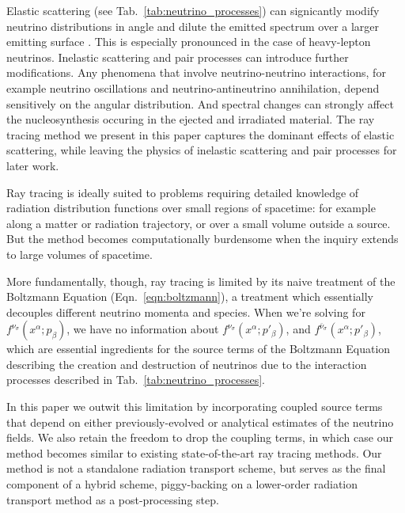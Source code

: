 \documentclass[aps,floatfix,prd,superscriptaddress,twocolumn]{revtex4-1}
\newcommand{\todo}[1]{\marginpar{\tiny{\textcolor{red}{#1}}}}
\begin{document}
Elastic scattering (see Tab.~\ref{tab:neutrino_processes}) can signicantly
modify neutrino distributions in angle and dilute the emitted spectrum over a
larger emitting surface \citep{pere2016-asl}.
This is especially pronounced in the case of heavy-lepton neutrinos.
\todo{cite}
Inelastic scattering and pair processes can introduce further modifications.
Any phenomena that involve neutrino-neutrino interactions,
for example neutrino oscillations and neutrino-antineutrino annihilation,
\todo{cite}
depend sensitively on the angular distribution.
And spectral changes can strongly affect the nucleosynthesis
occuring in the ejected and irradiated material.
\todo{justify these statements}
The ray tracing method we present in this paper captures the dominant effects
of elastic scattering, while leaving the physics of inelastic scattering and
pair processes for later work.

Ray tracing is ideally suited to problems requiring detailed knowledge of
radiation distribution functions over small regions of spacetime:
for example along a matter or radiation trajectory,
or over a small volume outside a source.
But the method becomes computationally burdensome when the inquiry extends
to large volumes of spacetime.

More fundamentally, though, ray tracing is limited by its naive
treatment of the Boltzmann Equation (Eqn.~\ref{eqn:boltzmann}),
a treatment which essentially decouples different neutrino momenta and species.
\todo{clarify how momenta are decoupled}
When we're solving for $f^{\nu_\sigma}(x^\alpha;p_\beta)$, we have no
information about $f^{\nu_\sigma}(x^\alpha;p'_\beta)$, and
$f^{\bar{\nu}_\sigma}(x^\alpha;p'_\beta)$, which are essential ingredients
for the source terms of the Boltzmann Equation describing the creation and
destruction of neutrinos due to the interaction processes described in
Tab.~\ref{tab:neutrino_processes}.

In this paper we outwit this limitation by incorporating coupled source terms
that depend on either previously-evolved or analytical
estimates of the neutrino fields.
We also retain the freedom to drop the coupling terms, in which case our method
becomes similar to existing state-of-the-art ray tracing methods.
Our method is not a standalone radiation transport scheme,
but serves as the final component of a hybrid scheme,
piggy-backing on a lower-order radiation transport method as a
post-processing step.
\end{document}

